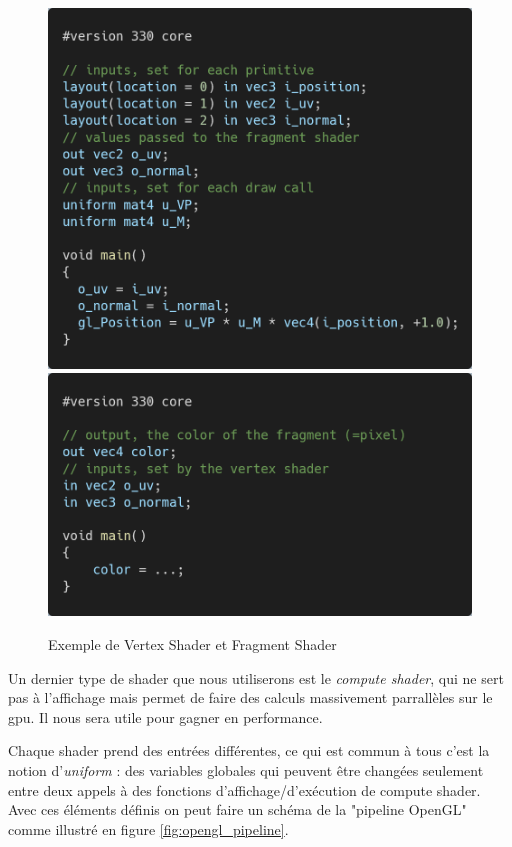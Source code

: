 \documentclass{EPUProjetDi}
\begin{document}
\begin{figure}[ht]
	\centering
	\includegraphics[scale=.2]{vertex_sample}
	\includegraphics[scale=.2]{fragment_sample}
	\caption{Exemple de Vertex Shader et Fragment Shader}
	\label{fig:vs_fs_shaders}
\end{figure}

Un dernier type de shader que nous utiliserons est le \textit{compute shader}, qui ne sert pas à l'affichage mais permet de faire des calculs massivement parrallèles sur le gpu. Il nous sera utile pour gagner en performance.
\par
Chaque shader prend des entrées différentes, ce qui est commun à tous c'est la notion d'\textit{uniform} : des variables globales qui peuvent être changées seulement entre deux appels à des fonctions d'affichage/d'exécution de compute shader.
Avec ces éléments définis on peut faire un schéma de la "pipeline OpenGL"  comme illustré en figure \ref{fig:opengl_pipeline}.
\end{document}
